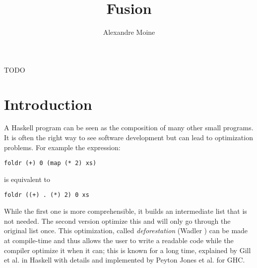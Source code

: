 \documentclass[format=sigplan]{acmart}
\begin{document}
\title{Fusion}
\author{Alexandre Moine}


\begin{abstract}
\end{abstract}

%
%
\begin{CCSXML}
TODO
\end{CCSXML}


%


%
\maketitle

\section{Introduction}

A Haskell program can be seen as the composition of many other small programs. It is often the right way to see software development but can lead to optimization problems. For example the expression:
\begin{verbatim}
foldr (+) 0 (map (* 2) xs)
\end{verbatim}
is equivalent to
\begin{verbatim}
foldr ((+) . (*) 2) 0 xs
\end{verbatim}

While the first one is more comprehensible, it builds an intermediate list that is not needed. The second version optimize this and will only go through the original list once.
This optimization, called \emph{deforestation} (Wadler \cite{WADLER1990231}) can be made at compile-time and thus allows the user to write a readable code while the compiler optimize it when it can; this is known for a long time, explained by Gill et al. \cite{Gill:1993:SCD:165180.165214} in Haskell with details and implemented by Peyton Jones et al. \cite{playing-by-the-rules-rewriting-as-a-practical-optimisation-technique-in-ghc} for GHC.
\end{document}
